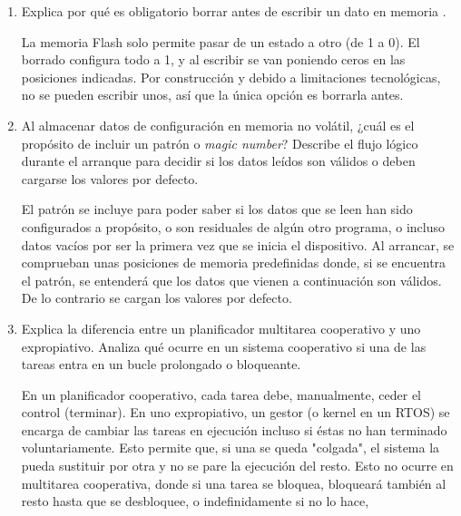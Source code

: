 \documentclass[svgnames,spanish,11pt,a4paper]{article}
\newcounter{solution}
\begin{document}
\begin{enumerate}

        \item Explica por qué es obligatorio borrar antes de escribir un dato en memoria .
                    
            \begin{solution}
                La memoria Flash solo permite pasar de un estado a otro (de 1 a 0). El borrado configura todo a 1, y al escribir se van poniendo ceros en las posiciones indicadas. Por construcción y debido a limitaciones tecnológicas, no se pueden escribir unos, así que la única opción es borrarla antes.
            \end{solution}
        
        \item Al almacenar datos de configuración en memoria no volátil, ¿cuál es el propósito de incluir un patrón o \emph{magic number}? Describe el flujo lógico durante el arranque para decidir si los datos leídos son válidos o deben cargarse los valores por defecto.
        
            \begin{solution}
                El patrón se incluye para poder saber si los datos que se leen han sido configurados a propósito, o son residuales de algún otro programa, o incluso datos vacíos por ser la primera vez que se inicia el dispositivo. Al arrancar, se comprueban unas posiciones de memoria predefinidas donde, si se encuentra el patrón, se entenderá que los datos que vienen a continuación son válidos. De lo contrario se cargan los valores por defecto.
            \end{solution}


        
        \item Explica la diferencia entre un planificador multitarea cooperativo y uno expropiativo. Analiza qué ocurre en un sistema cooperativo si una de las tareas entra en un bucle prolongado o bloqueante.  
        
            \begin{solution}
                En un planificador cooperativo, cada tarea debe, manualmente, ceder el control (terminar). En uno expropiativo, un gestor (o kernel en un RTOS) se encarga de cambiar las tareas en ejecución incluso si éstas no han terminado voluntariamente. Esto permite que, si una se queda "colgada", el sistema la pueda sustituir por otra y no se pare la ejecución del resto. Esto no ocurre en multitarea cooperativa, donde si una tarea se bloquea, bloqueará también al resto hasta que se desbloquee, o indefinidamente si no lo hace,
            \end{solution}
        

\end{enumerate}
\end{document}
